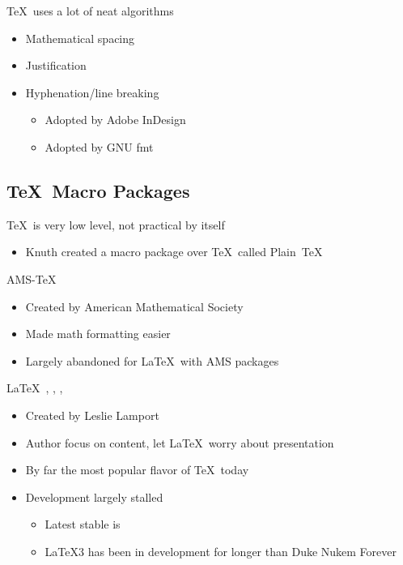 \documentclass{beamer}                  %
\newcommand{\srule}{
	\rule{\textwidth}{1pt}\\
}
\newlength{\subsecwidth}
\newenvironment{slide}{
	\begin{frame} %
	\settowidth{\subsecwidth}{\insertsubsection} %
	\ifthenelse{\dimtest{\subsecwidth}{<}{1pt}}{ %
		\frametitle{\insertsection\\             %
		\vspace{-1ex}                            %
		\color{fore}\srule                       %
		\par                                     %
		\vspace{-3ex}                            %
		}
	}{                                           %
		\frametitle{\insertsection\ -- \insertsubsection\\ %
		\vspace{-1ex}                            %
		\color{fore}\srule                       %
		\par                                     %
		\vspace{-3ex}                            %
		}
	}
	\Large                                       %
}{
	\end{frame}
}
\begin{document}
\begin{slide}
	\TeX\ uses a lot of neat algorithms
	\begin{itemize}
		\item Mathematical spacing
		\item Justification
		\item Hyphenation/line breaking
		\begin{itemize}
			\item Adopted by Adobe InDesign
			\item Adopted by GNU fmt
		\end{itemize}
	\end{itemize}
\end{slide}

\subsection{\TeX\ Macro Packages} %
\begin{slide}
	\TeX\ is very low level, not practical by itself
	\begin{itemize}
		\item Knuth created a macro package over \TeX\ called Plain~\TeX
	\end{itemize}
\end{slide}

\begin{slide}
	AMS-\TeX
	\begin{itemize}
		\item Created by American Mathematical Society
		\item Made math formatting easier
		\item Largely abandoned for \LaTeX\ with AMS packages
	\end{itemize}
\end{slide}

\begin{slide}
	\LaTeX\ , , ,
	 \label{ipa3}
	\begin{itemize}
		\item Created by Leslie Lamport
		\item Author focus on content, let \LaTeX\ worry about presentation
		\item By far the most popular flavor of \TeX\ today
		\item Development largely stalled
		\begin{itemize}
			\item Latest stable is \LaTeXe
			\item \LaTeX3 has been in development for longer than Duke Nukem
			Forever
		\end{itemize}
	\end{itemize}
\end{slide}
\end{document}
